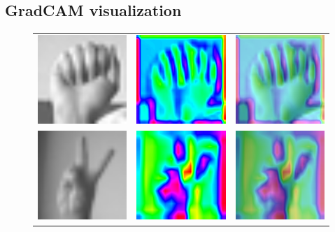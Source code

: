 \documentclass[a4paper]{article}
\begin{document}
\subsection{GradCAM visualization}
\label{sec:gradcam}
\begin{figure}[t]
     \centering
     \begin{tabular}{ccc}
          \includegraphics[width=.25\linewidth]{graphics/gradcam/layer1/0_original}&\includegraphics[width=.25\linewidth]{graphics/gradcam/layer1/0_map}&\includegraphics[width=.25\linewidth]{graphics/gradcam/layer1/0_overlaid} \\
          \includegraphics[width=.25\linewidth]{graphics/gradcam/layer3/0_original}&\includegraphics[width=.25\linewidth]{graphics/gradcam/layer3/0_map}&\includegraphics[width=.25\linewidth]{graphics/gradcam/layer3/0_overlaid} \\

\end{tabular}
\end{figure}
\end{document}
